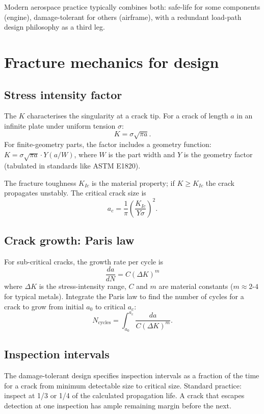 Modern aerospace practice typically combines both: safe-life for some components (engine), damage-tolerant for others (airframe), with a redundant load-path design philosophy as a third leg.

\section{Fracture mechanics for design}

\subsection{Stress intensity factor}

The  $K$ characterises the singularity at a crack tip. For a crack of length $a$ in an infinite plate under uniform tension $\sigma$:
\[
K = \sigma \sqrt{\pi a}.
\]
For finite-geometry parts, the factor includes a geometry function: $K = \sigma \sqrt{\pi a} \cdot Y(a/W)$, where $W$ is the part width and $Y$ is the geometry factor (tabulated in standards like ASTM E1820).

The fracture toughness $K_{Ic}$ is the material property; if $K \geq K_{Ic}$ the crack propagates unstably. The critical crack size is
\[
a_c = \frac{1}{\pi} \left( \frac{K_{Ic}}{Y \sigma} \right)^2.
\]

\subsection{Crack growth: Paris law}

For sub-critical cracks, the growth rate per cycle is
\[
\frac{da}{dN} = C (\Delta K)^m
\]
where $\Delta K$ is the stress-intensity range, $C$ and $m$ are material constants ($m \approx 2$-$4$ for typical metals). Integrate the Paris law to find the number of cycles for a crack to grow from initial $a_0$ to critical $a_c$:
\[
N_{\mathrm{cycles}} = \int_{a_0}^{a_c} \frac{da}{C (\Delta K)^m}.
\]

\subsection{Inspection intervals}

The damage-tolerant design specifies inspection intervals as a fraction of the time for a crack from minimum detectable size to critical size. Standard practice: inspect at 1/3 or 1/4 of the calculated propagation life. A crack that escapes detection at one inspection has ample remaining margin before the next.

